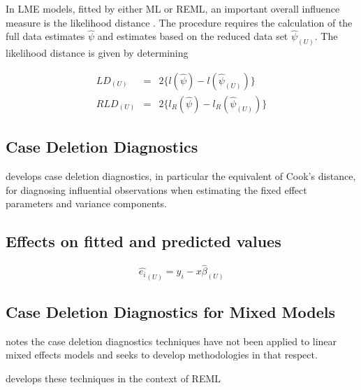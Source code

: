 \documentclass[Chap5amain.tex]{subfiles}
\begin{document}
 
 
 
 
 
 In LME models, fitted by either ML or REML, an important overall
 influence measure is the likelihood distance \citep{cook82}. The
 procedure requires the calculation of the full data estimates
 $\hat{\psi}$ and estimates based on the reduced data set
 $\hat{\psi}_{(U)}$. The likelihood distance is given by
 determining
 
 
 \begin{eqnarray}
 	LD_{(U)} &=& 2\{l(\hat{\psi}) - l( \hat{\psi}_{(U)}) \}\\
 	RLD_{(U)} &=& 2\{l_{R}(\hat{\psi}) - l_{R}(\hat{\psi}_{(U)})\}
 \end{eqnarray}
 
 

\newpage
\subsection{Case Deletion Diagnostics} %


\citet{CPJ} develops  case deletion diagnostics, in particular the equivalent of  Cook's distance, for diagnosing influential observations when estimating the fixed effect parameters and variance components.

\subsection{Effects on fitted and predicted values}
\begin{equation}
\hat{e_{i}}_{(U)} = y_{i} - x\hat{\beta}_{(U)}
\end{equation}




\subsection{Case Deletion Diagnostics for Mixed Models}

\citet{Christiansen} notes the case deletion diagnostics techniques have not been applied to linear mixed effects models and seeks to develop methodologies in that respect.

\citet{Christiansen} develops these techniques in the context of REML
\end{document}
